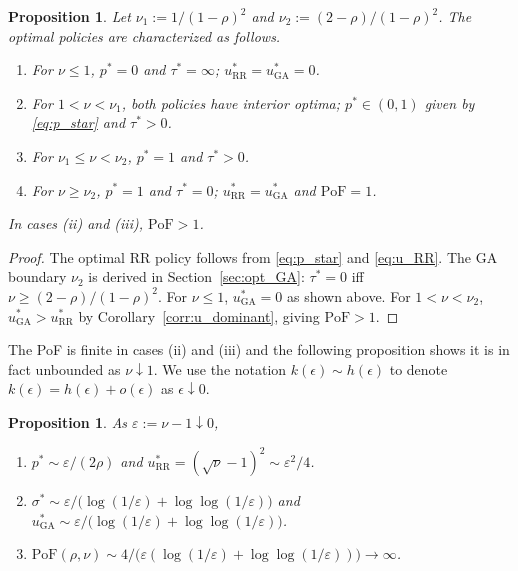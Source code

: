 \documentclass[11pt]{article}
\newtheorem{proposition}[theorem]{Proposition}
\begin{document}
\begin{proposition}\label{prop:cases}
Let $\nu_1:=1/(1-\rho)^2$ and $\nu_2:=(2-\rho)/(1-\rho)^2$. The optimal policies are characterized as follows.
\begin{enumerate}
    \item[\rm(i)] For $\nu \leq 1$, $p^*=0$ and $\tau^*=\infty$; $u^*_{\mathrm{RR}}=u^*_{\mathrm{GA}}=0$.
    \item[\rm(ii)] For $1 < \nu <  \nu_1$, both policies have interior optima; $p^*\in(0,1)$ given by \eqref{eq:p_star} and $\tau^*>0$.
    \item[\rm(iii)] For $\nu_1 \leq \nu < \nu_2$, $p^*=1$ and $\tau^*>0$.
    \item[\rm(iv)] For $\nu \geq  \nu_2$, $p^*=1$ and $\tau^*=0$; $u^*_{\mathrm{RR}}=u^*_{\mathrm{GA}}$ and $\mathrm{PoF}=1$.
\end{enumerate}
In cases \rm{(ii)} and \rm{(iii)}, $\mathrm{PoF}>1$.
\end{proposition}
\begin{proof}
The optimal RR policy follows from \eqref{eq:p_star} and \eqref{eq:u_RR}.  The GA boundary $\nu_2$ is derived in Section~\ref{sec:opt_GA}: $\tau^*=0$ iff $\nu\geq(2-\rho)/(1-\rho)^2$.  For $\nu\leq 1$, $u^*_{\mathrm{GA}}=0$ as shown above.  For $1<\nu<\nu_2$, $u^*_{\mathrm{GA}}>u^*_{\mathrm{RR}}$ by Corollary~\ref{corr:u_dominant}, giving $\mathrm{PoF}>1$.
\end{proof}
 
The PoF is finite in cases (ii) and (iii) and the following proposition shows it is in fact unbounded as $\nu\downarrow 1$. We use the notation $k(\epsilon)\sim h(\epsilon)$ to denote $k(\epsilon)=h(\epsilon)+o(\epsilon)$ as $\epsilon\downarrow 0$.

\begin{proposition}\label{prop:PoF_divergence}
As $\varepsilon:=\nu-1\downarrow 0$, 
\begin{enumerate}
    \item[\rm(a)] $p^*\sim \varepsilon/(2\rho)$ and $u^*_{\mathrm{RR}}=(\sqrt\nu-1)^2\sim \varepsilon^2/4$.
    \item[\rm(b)] $\sigma^*\sim \varepsilon/\bigl(\log(1/\varepsilon)+\log\log(1/\varepsilon)\bigr)$ and $u^*_{\mathrm{GA}}\sim \varepsilon/\bigl(\log(1/\varepsilon)+\log\log(1/\varepsilon)\bigr)$.
    \item[\rm(c)] $\mathrm{PoF}(\rho,\nu)\sim 4/\bigl(\varepsilon(\log(1/\varepsilon)+\log\log(1/\varepsilon))\bigr)\to\infty$.
\end{enumerate}
\end{proposition}
 
\end{document}
